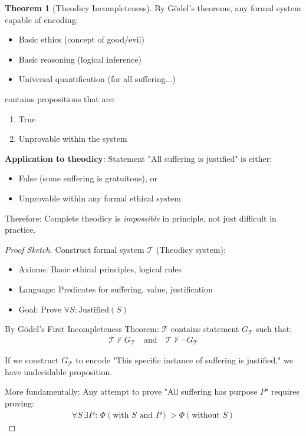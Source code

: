\documentclass[11pt,a4paper]{article}
\theoremstyle{definition}
\newtheorem{theorem}{Theorem}[section]
\theoremstyle{remark}
\begin{document}
\begin{enumerate}
\begin{theorem}[Theodicy Incompleteness]
By Gödel's theorems, any formal system capable of encoding:
\begin{itemize}
    \item Basic ethics (concept of good/evil)
    \item Basic reasoning (logical inference)
    \item Universal quantification (for all suffering...)
\end{itemize}

contains propositions that are:
\begin{enumerate}
    \item True
    \item Unprovable within the system
\end{enumerate}

\textbf{Application to theodicy}: Statement "All suffering is justified" is either:
\begin{itemize}
    \item False (some suffering is gratuitous), or
    \item Unprovable within any formal ethical system
\end{itemize}

Therefore: Complete theodicy is \textit{impossible} in principle, not just difficult in practice.
\end{theorem}

\begin{proof}[Proof Sketch]
Construct formal system \(\mathcal{T}\) (Theodicy system):
\begin{itemize}
    \item Axioms: Basic ethical principles, logical rules
    \item Language: Predicates for suffering, value, justification
    \item Goal: Prove \(\forall S: \text{Justified}(S)\)
\end{itemize}

By Gödel's First Incompleteness Theorem: \(\mathcal{T}\) contains statement \(G_{\mathcal{T}}\) such that:
\begin{align}
\mathcal{T} \nvdash G_{\mathcal{T}} \quad \text{and} \quad \mathcal{T} \nvdash \neg G_{\mathcal{T}}
\end{align}

If we construct \(G_{\mathcal{T}}\) to encode "This specific instance of suffering is justified," we have undecidable proposition.

More fundamentally: Any attempt to prove "All suffering has purpose \(P\)" requires proving:
\begin{align}
\forall S \, \exists P \, : \, \Phi(\text{with } S \text{ and } P) > \Phi(\text{without } S)
\end{align}


\end{proof}
\end{enumerate}
\end{document}
